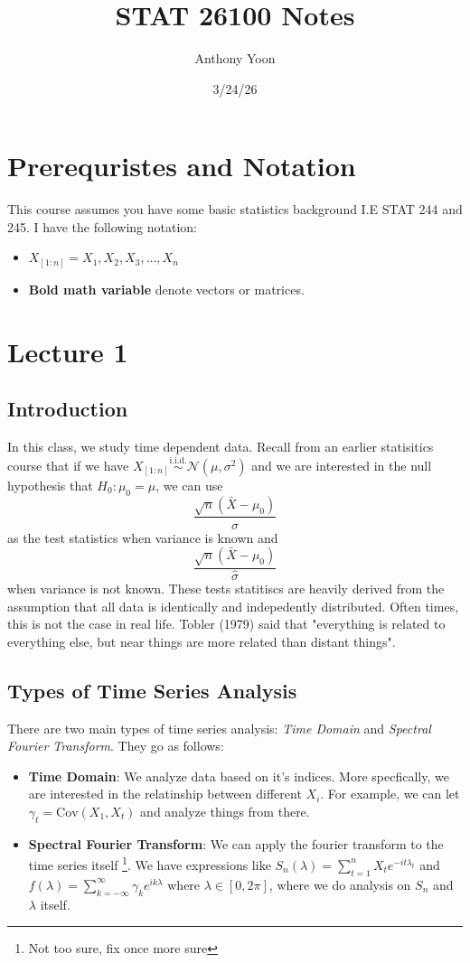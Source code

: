 \documentclass[12pt]{article}
\title{STAT 26100 Notes}
\author{Anthony Yoon}
\date{3/24/26}
\newcommand{\Cov}{\text{Cov}}
\newcommand{\iid}{\overset{\text{i.i.d.}}{\sim}}
\begin{document}
\maketitle
\tableofcontents
\newpage
\noindent
\section*{Prerequristes and Notation}
This course assumes you have some basic statistics background I.E STAT 244 and 245. I have the following notation:
\begin{itemize}
	\item $X_{[1:n]} = X_1, X_2, X_3, \dots, X_n$
	\item \textbf{Bold math variable} denote vectors or matrices.
\end{itemize}
\newpage
\section{Lecture 1}
\subsection{Introduction}
In this class, we study time dependent data. Recall from an earlier statisitics course that if we have $X_{[1:n]} \iid \mathcal{N}(\mu, \sigma^2)$ and we are interested in the null hypothesis that $H_0: \mu_0 = \mu$, we can use
\[
	\frac{\sqrt{n}(\bar{X} - \mu_0)}{\sigma}
\]
as the test statistics when variance is known and 
\[
	\frac{\sqrt{n}(\bar{X} - \mu_0)}{\hat{\sigma}}
\]
when variance is not known. These tests statitiscs are heavily derived from the assumption that all data is identically and indepedently distributed. Often times, this is not the case in real life. Tobler (1979) said that "everything is related to everything else, but near things are more related than distant things". 
\subsection{Types of Time Series Analysis}
There are two main types of time series analysis: \textit{Time Domain} and \textit{Spectral Fourier Transform}. They go as follows:
\begin{itemize}
	\item \textbf{Time Domain}: We analyze data based on it's indices. More specfically, we are interested in the relatinship between different $X_i$. For example, we can let $\gamma_t= \Cov(X_1, X_t)$ and analyze things from there. 
	\item \textbf{Spectral Fourier Transform}: We can apply the fourier transform to the time series itself \footnote{Not too sure, fix once more sure}. We have expressions like $S_n(\lambda)  = \sum_{t = 1}^n X_t e^{-it\lambda_t}$ and $f(\lambda) = \sum_{k = -\infty}^\infty \gamma_k e^{ik \lambda}$ where $\lambda \in [0,2\pi]$, where we do analysis on $S_n$ and $\lambda$ itself. 
\end{itemize}
\end{document}
